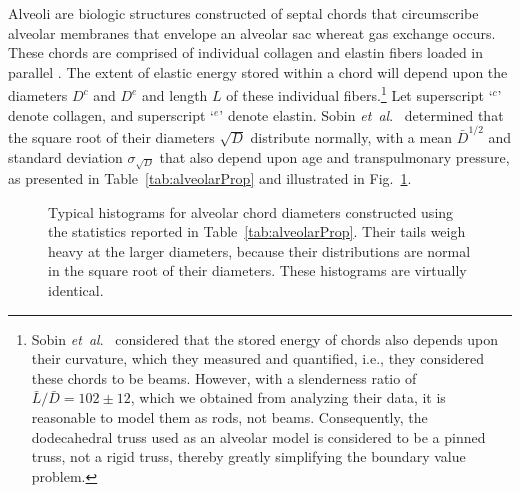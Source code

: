Alveoli are biologic structures constructed of septal chords that circumscribe alveolar membranes that envelope an alveolar sac whereat gas exchange occurs.  These chords are comprised of individual collagen and elastin fibers loaded in parallel \cite{Matsudaetal87,Sobinetal88}.  The extent of elastic energy stored within a chord will depend upon the diameters $D^c$ and $D^e$ and length $L$ of these individual fibers.\footnote{
	Sobin \textit{et~al}.\ \cite{Sobinetal88} considered that the stored energy of chords also depends upon their curvature, which they measured and quantified, i.e., they considered these chords to be beams.  However, with a slenderness ratio of $\bar{L}/\bar{D} = 102 \pm 12$, which we obtained from analyzing their data, it is reasonable to model them as rods, not beams.  Consequently, the dodecahedral truss used as an alveolar model is considered to be a pinned truss, not a rigid truss, thereby greatly simplifying the boundary value problem.
}
Let superscript `$\mbox{}^c$' denote collagen, and superscript `$\mbox{}^e$' denote elastin.  Sobin \textit{et~al}.\ \cite{Sobinetal88} determined that the square root of their diameters $\sqrt{D}$ distribute normally, with a mean $\bar{D}^{1/2}$ and standard deviation $\sigma_{\sqrt{D}}$ that also depend upon age and transpulmonary pressure, as presented in Table~\ref{tab:alveolarProp} and illustrated in Fig.~\ref{fig:septalChordStats}. 

\begin{figure}
    \centering
    \hfill
    \caption{Typical histograms for alveolar chord diameters constructed using the statistics reported in Table~\ref{tab:alveolarProp}.  Their tails weigh heavy at the larger diameters, because their distributions are normal in the square root of their diameters.  These histograms are virtually identical.}
    \label{fig:septalChordStats}
\end{figure}

